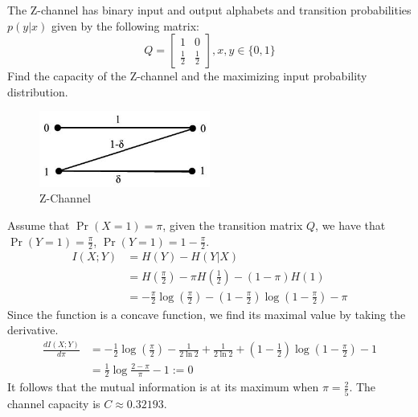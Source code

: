 \begin{exercise}[Z-channel]{ The Z-channel has binary input and output alphabets and transition probabilities $p(y | x)$ given by the following matrix:
$$Q=\left[\begin{array}{ll}1 & 0 \\ \frac{1}{2} & \frac{1}{2}\end{array}\right], x, y \in\{0,1\}$$
Find the capacity of the Z-channel and the maximizing input probability distribution.
\begin{figure}[H]
  \centering
  \includegraphics[height=2.5cm]{img/6-3.jpg}
  \caption{Z-Channel}
  \label{fig:z-chan}
\end{figure}
}
  \begin{solution}
  Assume that $\Pr(X=1)=\pi$, given the transition matrix $Q$, we have that $\Pr(Y=1) = \frac{\pi}{2}$, $\Pr(Y=1) = 1 - \frac{\pi}{2}$.
  \begin{equation}
    \begin{aligned}
      I(X;Y)&= H(Y) - H(Y|X) \\
      &= H(\frac{\pi}{2}) - \pi H(\frac{1}{2}) - (1-\pi)H(1) \\
      &= -\frac{\pi}{2} \log(\frac{\pi}{2}) - \left(1 - \frac{\pi}{2}\right) \log \left(1 - \frac{\pi}{2}\right) - \pi
    \end{aligned}
  \end{equation}
  Since the function is a concave function, we find its maximal value by taking the derivative.
  \begin{equation}
    \begin{aligned}
      \frac{dI(X;Y)}{d\pi} &= -\frac{1}{2} \log(\frac{\pi}{2}) - \frac{1}{2\ln 2} + \frac{1}{2\ln 2} + \left(1 - \frac{1}{2}\right) \log \left(1 - \frac{\pi}{2}\right) -1 \\
      &= \frac{1}{2} \log \frac{2-\pi}{\pi} - 1 := 0      
    \end{aligned}
  \end{equation}
  It follows that the mutual information is at its maximum when $\pi = \frac{2}{5}$. The channel capacity is $C \approx 0.32193$.
  \end{solution}
  \label{ex4}
\end{exercise}

